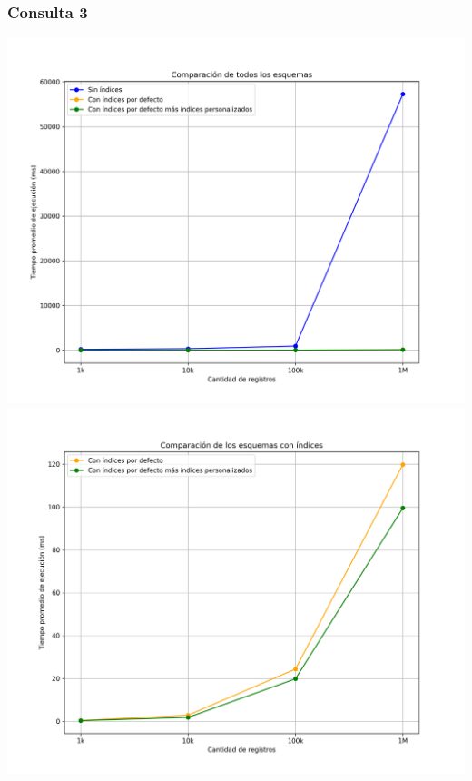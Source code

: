 \subsubsection{Consulta 3}
\begin{center}
	\includegraphics[width=\linewidth, keepaspectratio]{figures/query_3_execution_times_1.png}
	\includegraphics[width=\linewidth, keepaspectratio]{figures/query_3_execution_times_2.png}
\end{center}
